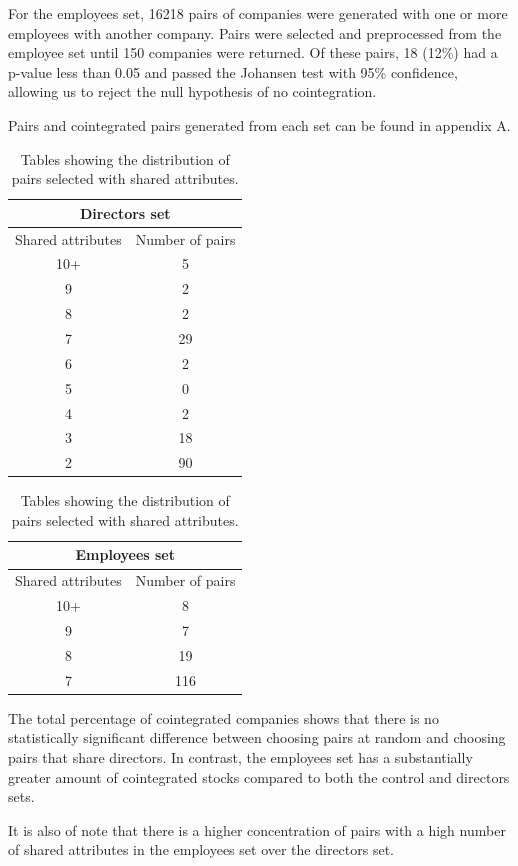 \documentclass{UoYCSproject}
\begin{document}
For the employees set, 16218 pairs of companies were generated with one or more employees with another company. Pairs were selected and preprocessed from the employee set until 150 companies were returned. Of these pairs, 18 (12\%) had a p-value less than 0.05 and passed the Johansen test with 95\% confidence, allowing us to reject the null hypothesis of no cointegration.

Pairs and cointegrated pairs generated from each set can be found in appendix A.\clearpage

\begin{table}[h]
\begin{tabular}{|c|c|}
\hline
\multicolumn{2}{|c|}{Directors set} \\\hline
Shared attributes & Number of pairs \\\hline
10+ & 5 \\\hline
9 & 2 \\\hline
8 & 2 \\\hline
7 & 29 \\\hline
6 & 2 \\\hline
5 & 0 \\\hline
4 & 2 \\\hline
3 & 18 \\\hline
2 & 90 \\\hline
\end{tabular}
\qquad
\begin{tabular}{|c|c|}
\hline
\multicolumn{2}{|c|}{Employees set} \\\hline
Shared attributes & Number of pairs \\\hline
10+ & 8 \\\hline
9 & 7 \\\hline
8 & 19 \\\hline
7 & 116 \\\hline
\end{tabular}
\caption{Tables showing the distribution of pairs selected with shared attributes.}
\end{table}

The total percentage of cointegrated companies shows that there is no statistically significant difference between choosing pairs at random and choosing pairs that share directors. In contrast, the employees set has a substantially greater amount of cointegrated stocks compared to both the control and directors sets.

It is also of note that there is a higher concentration of pairs with a high number of shared attributes in the employees set over the directors set. 
\end{document}
